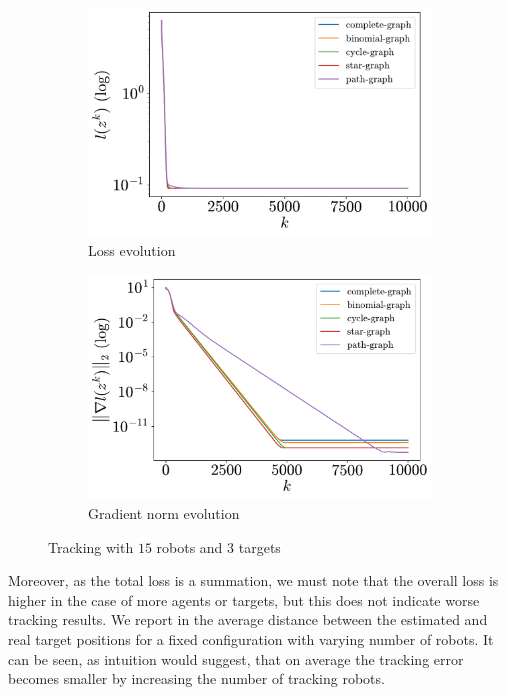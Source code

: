 \documentclass[a4paper,11pt,oneside]{book}
\begin{document}
\begin{figure}[tb!]
      \centering
      \begin{subfigure}[t]{0.46\linewidth}
            \centering
            \includegraphics[width=\linewidth]{./figs/tracking/15_3_2/loss.pdf} 
            \caption{Loss evolution}
      \end{subfigure}
      \hfill
      \begin{subfigure}[t]{0.46\linewidth}
            \centering
            \includegraphics[width=\linewidth]{./figs/tracking/15_3_2/gradient.pdf} 
            \caption{Gradient norm evolution}
      \end{subfigure}
      \caption{Tracking with $15$ robots and $3$ targets}
      \label{fig:tracking_15_3}
\end{figure}

Moreover, as the total loss is a summation, we must note that the overall loss is higher in the case of more agents or targets, but this does not indicate worse tracking results. We report in  the average distance between the estimated and real target positions for a fixed configuration with varying number of robots. It can be seen, as intuition would suggest, that on average the tracking error becomes smaller by increasing the number of tracking robots.
\end{document}
